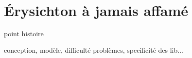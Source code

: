 \chapter{Érysichton à jamais affamé}
\label{chap:erysichtonConception}

point histoire \medbreak

conception, modèle, difficulté problèmes, specificité des lib...